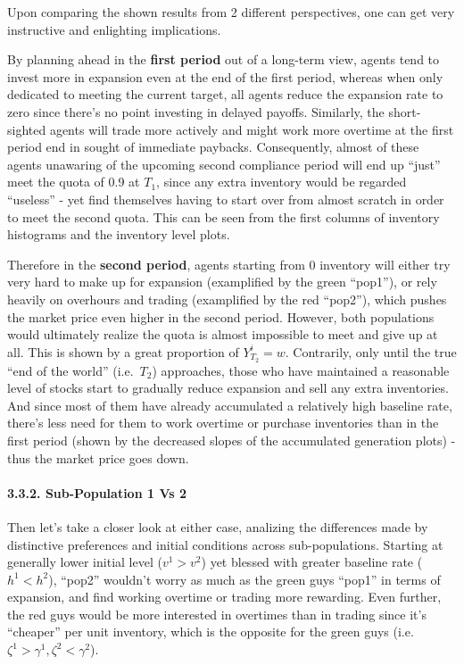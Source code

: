 \documentclass[
]{article}
\begin{document}
Upon comparing the shown results from 2 different perspectives, one can
get very instructive and enlighting implications.

By planning ahead in the \textbf{first period} out of a long-term view,
agents tend to invest more in expansion even at the end of the first
period, whereas when only dedicated to meeting the current target, all
agents reduce the expansion rate to zero since there's no point
investing in delayed payoffs. Similarly, the short-sighted agents will
trade more actively and might work more overtime at the first period end
in sought of immediate paybacks. Consequently, almost of these agents
unawaring of the upcoming second compliance period will end up ``just''
meet the quota of 0.9 at \(T_1\), since any extra inventory would be
regarded ``useless'' - yet find themselves having to start over from
almost scratch in order to meet the second quota. This can be seen from
the first columns of inventory histograms and the inventory level plots.

Therefore in the \textbf{second period}, agents starting from 0
inventory will either try very hard to make up for expansion
(examplified by the green ``pop1''), or rely heavily on overhours and
trading (examplified by the red ``pop2''), which pushes the market price
even higher in the second period. However, both populations would
ultimately realize the quota is almost impossible to meet and give up at
all. This is shown by a great proportion of \(Y_{T_2}^i=w\). Contrarily,
only until the true ``end of the world'' (i.e.~\(T_2\)) approaches,
those who have maintained a reasonable level of stocks start to
gradually reduce expansion and sell any extra inventories. And since
most of them have already accumulated a relatively high baseline rate,
there's less need for them to work overtime or purchase inventories than
in the first period (shown by the decreased slopes of the accumulated
generation plots) - thus the market price goes down.

\hypertarget{sub-population-1-vs-2}{%
\paragraph{3.3.2. Sub-Population 1 Vs 2}\label{sub-population-1-vs-2}}

Then let's take a closer look at either case, analizing the differences
made by distinctive preferences and initial conditions across
sub-populations. Starting at generally lower initial level (\(v^1>v^2\))
yet blessed with greater baseline rate (\(h^1<h^2\)), ``pop2'' wouldn't
worry as much as the green guys ``pop1'' in terms of expansion, and find
working overtime or trading more rewarding. Even further, the red guys
would be more interested in overtimes than in trading since it's
``cheaper'' per unit inventory, which is the opposite for the green guys
(i.e.~\(\zeta^1>\gamma^1, \zeta^2<\gamma^2\)).
\end{document}
